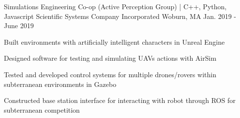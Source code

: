 \begin{cventries}
  \cventry
    {Simulations Engineering Co-op (Active Perception Group) | C++, Python, Javascript} %
    {Scientific Systems Company Incorporated} %
    {Woburn, MA} %
    {Jan. 2019 - June 2019} %
    {
      \begin{cvitems} %
        \item {Built environments with artificially intelligent characters in Unreal Engine}
        \item {Designed software for testing and simulating UAVs actions with AirSim}
        \item {Tested and developed control systems for multiple drones/rovers within subterranean environments in 
               Gazebo}
        \item {Constructed base station interface for interacting with robot through ROS for subterranean competition}
      \end{cvitems}
    }
\end{cventries}
